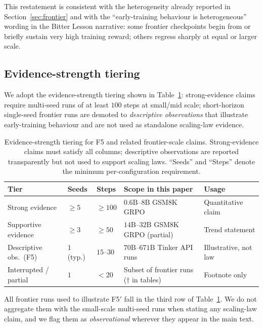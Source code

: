 This restatement is consistent with the heterogeneity already reported in
Section~\ref{sec:frontier} and with the ``early-training behaviour is
heterogeneous'' wording in the Bitter Lesson narrative: some frontier
checkpoints begin from or briefly sustain very high training reward; others
regress sharply at equal or larger scale.

\subsection{Evidence-strength tiering}

We adopt the evidence-strength tiering shown in
Table~\ref{tab:f5_evidence_tiers}: strong-evidence claims require multi-seed
runs of at least $100$ steps at small/mid scale; short-horizon single-seed
frontier runs are demoted to \emph{descriptive observations} that illustrate
early-training behaviour and are not used as standalone scaling-law evidence.

\begin{table}[htbp]
\centering
\caption{Evidence-strength tiering for F5 and related frontier-scale claims.
Strong-evidence claims must satisfy all columns; descriptive observations are
reported transparently but not used to support scaling laws. ``Seeds'' and
``Steps'' denote the minimum per-configuration requirement.}
\label{tab:f5_evidence_tiers}
\footnotesize
\setlength{\tabcolsep}{4pt}
\begin{tabular}{@{}l l l l l@{}}
\toprule
\textbf{Tier} & \textbf{Seeds} & \textbf{Steps} & \textbf{Scope in this paper} & \textbf{Usage} \\
\midrule
Strong evidence        & $\geq 5$ & $\geq 100$ & $0.6\mathrm{B}$--$8\mathrm{B}$ GSM8K GRPO & Quantitative claim \\
Supportive evidence    & $\geq 3$ & $\geq 50$  & $14\mathrm{B}$--$32\mathrm{B}$ GSM8K GRPO (partial) & Trend statement \\
Descriptive obs.\ (F5) & $1$ (typ.)   & $15$--$30$ & $70\mathrm{B}$--$671\mathrm{B}$ Tinker API runs  & Illustrative, not law \\
Interrupted / partial  & $1$       & $<20$      & Subset of frontier runs ($\dagger$ in tables) & Footnote only \\
\bottomrule
\end{tabular}
\end{table}

All frontier runs used to illustrate F5$'$ fall in the third row of
Table~\ref{tab:f5_evidence_tiers}. We do not aggregate them with the
small-scale multi-seed runs when stating any scaling-law claim, and we flag
them as \emph{observational} wherever they appear in the main text.

